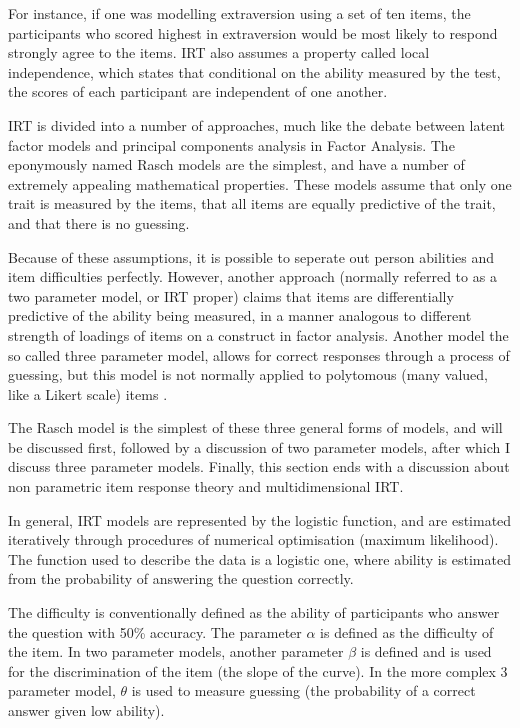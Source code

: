 For instance, if one was modelling extraversion using a set of ten items, the participants who scored highest in extraversion would be most likely to respond strongly agree to the items. IRT also assumes a property called local independence, which states that conditional on the ability measured by the test, the scores of each participant are independent of one another. 

IRT is divided into a number of approaches, much like the debate between latent factor models and principal components analysis in Factor Analysis\cite{van1997handbook,fischer1995rasch}. The eponymously named Rasch models are the simplest, and have a number of extremely appealing mathematical properties. These models assume that only one trait is measured by the items, that all items are equally predictive of the trait, and that there is no guessing. 

Because of these assumptions, it is possible to seperate out person abilities and item difficulties perfectly. However, another approach (normally referred to as a two parameter model, or IRT proper) claims that items are differentially predictive of the ability being measured, in a manner analogous to different strength of loadings of items on a construct in factor analysis. Another model the so called three parameter model, allows for correct responses through a process of guessing, but this model is not normally applied to polytomous (many valued, like a Likert scale) items \cite{van1997handbook,Mair2010}.  

The Rasch model is the simplest of these three general forms of models, and will be discussed first, followed by a discussion of two parameter models, after which I discuss three parameter models. Finally, this section ends with a discussion about non parametric item response theory and multidimensional IRT. 

In general, IRT models are represented by the logistic function, and are estimated iteratively through procedures of numerical optimisation (maximum likelihood). The function used to describe the data is a logistic one, where ability is estimated from the probability of answering the question correctly. 

The difficulty is conventionally defined as the ability of participants who answer the question with 50\% accuracy. The parameter $\alpha$ is defined as the difficulty of the item. In two parameter models, another parameter $\beta$ is defined and is used for the discrimination of the item (the slope of the curve). In the more complex 3 parameter model, $\theta$ is used to measure guessing (the probability of a correct answer given low ability)\cite{van1997handbook}. 

